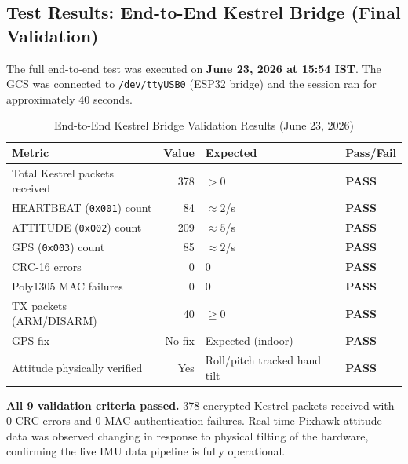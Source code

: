 \documentclass[11pt,a4paper]{article}
\begin{document}
\subsection{Test Results: End-to-End Kestrel Bridge (Final Validation)}
\label{sec:finalresults}

The full end-to-end test was executed on \textbf{June 23, 2026 at 15:54 IST}.
The GCS was connected to \texttt{/dev/ttyUSB0} (ESP32 bridge) and the session
ran for approximately 40 seconds.

\begin{table}[H]
    \centering
    \begin{tabular}{@{}lrll@{}}
        \toprule
        \textbf{Metric}                  & \textbf{Value} &
        \textbf{Expected}                & \textbf{Pass/Fail} \\
        \midrule
        Total Kestrel packets received   & 378 &
            $> 0$  & \textcolor{successgreen}{\textbf{PASS}} \\
        HEARTBEAT (\texttt{0x001}) count & 84  &
            $\approx 2$/s & \textcolor{successgreen}{\textbf{PASS}} \\
        ATTITUDE (\texttt{0x002}) count  & 209 &
            $\approx 5$/s & \textcolor{successgreen}{\textbf{PASS}} \\
        GPS (\texttt{0x003}) count       & 85  &
            $\approx 2$/s & \textcolor{successgreen}{\textbf{PASS}} \\
        CRC-16 errors                    & 0   &
            0      & \textcolor{successgreen}{\textbf{PASS}} \\
        Poly1305 MAC failures            & 0   &
            0      & \textcolor{successgreen}{\textbf{PASS}} \\
        TX packets (ARM/DISARM)          & 40  &
            $\geq 0$ & \textcolor{successgreen}{\textbf{PASS}} \\
        GPS fix                          & No fix &
            Expected (indoor) & \textcolor{successgreen}{\textbf{PASS}} \\
        Attitude physically verified     & Yes &
            Roll/pitch tracked hand tilt &
            \textcolor{successgreen}{\textbf{PASS}} \\
        \bottomrule
    \end{tabular}
    \caption{End-to-End Kestrel Bridge Validation Results (June 23, 2026)}
\end{table}

\begin{successbox}
    \textbf{All 9 validation criteria passed.} 378 encrypted Kestrel packets
    received with 0 CRC errors and 0 MAC authentication failures.
    Real-time Pixhawk attitude data was observed changing in response to
    physical tilting of the hardware, confirming the live IMU data pipeline
    is fully operational.
\end{successbox}
\end{document}
